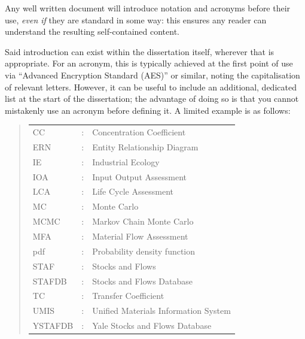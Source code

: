 \documentclass[ %
                    author={Tom Jager},
                supervisor={Dr. Daniel Schien},
                    degree={MEng},
                     title={A Bayesian Inference Engine for UMIS Structured Data},
                  subtitle={},
                      type={research},
                      year={2019} ]{dissertation}
\begin{document}
\noindent
Any well written document will introduce notation and acronyms before
their use, {\em even if} they are standard in some way: this ensures 
any reader can understand the resulting self-contained content.  

Said introduction can exist within the dissertation itself, wherever 
that is appropriate.  For an acronym, this is typically achieved at 
the first point of use via ``Advanced Encryption Standard (AES)'' or 
similar, noting the capitalisation of relevant letters.  However, it 
can be useful to include an additional, dedicated list at the start 
of the dissertation; the advantage of doing so is that you cannot 
mistakenly use an acronym before defining it.  A limited example is 
as follows:

\begin{quote}
\noindent
\begin{tabular}{lcl}
CC                 &:     & Concentration Coefficient
  \\
ERN                &:     & Entity Relationship Diagram
   \\
IE                 &:     & Industrial Ecology                                         \\
IOA                &:     & Input Output Assessment
  \\
LCA                &:     & Life Cycle Assessment
  \\
MC             &:      &  Monte Carlo
  \\
MCMC             &:      &  Markov Chain Monte Carlo
  \\
MFA                &:     & Material Flow Assessment
  \\
pdf             &:       & Probability density function
 \\
STAF               &:     & Stocks and Flows
 \\
STAFDB             &:      &  Stocks and Flows Database
  \\
TC                 &:     & Transfer Coefficient
 \\
UMIS               &:     & Unified Materials Information System
  \\
YSTAFDB            &:     & Yale Stocks and Flows Database
  \\

\end{tabular}
\end{quote}

\end{document}
